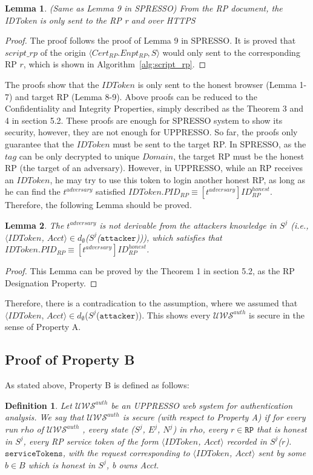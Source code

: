 \documentclass[letterpaper,onecolumn,10pt]{article}
\newtheorem{definition}{Definition}
\newtheorem{lemma}{Lemma}
\begin{document}
\begin{lemma}
(Same as Lemma 9 in SPRESSO) From the RP document, the IDToken is only sent to the RP r and over HTTPS
\end{lemma}
\begin{proof}
The proof follows the proof of Lemma 9 in SPRESSO.
It is proved that $script\_rp$ of the origin $\langle Cert_{RP}.Enpt_{RP}, S \rangle$ would only sent to the corresponding RP $r$, which is shown in Algorithm~\ref{alg:script_rp}.
\end{proof}


The proofs show that the $IDToken$ is only sent to the honest browser (Lemma 1-7) and  target RP (Lemma 8-9). 
Above proofs can be reduced to the {\color{blue}Confidentiality and Integrity Properties}, simply described as the {\color{blue} Theorem 3 and 4} in section 5.2.
These proofs are enough for SPRESSO system to show its security, however, they are not enough for UPPRESSO.
So far, the proofs only guarantee that the $IDToken$ must be sent to the target RP.
In SPRESSO, as the $tag$ can be only decrypted to unique $Domain$, the target RP must be the honest RP (the target of an adversary).
However, in UPPRESSO, while an RP receives an $IDToken$, he may try to use this token to login another honest RP, as long as he can find the $t^{adversary}$ satisfied $IDToken.PID_{RP} \equiv [t^{adversary}]ID_{RP}^{honest}$.
Therefore, the following Lemma should be proved.

\begin{lemma}
The $t^{adversary}$ is not derivable from the attackers knowledge in $S^j$ (i.e., $\langle IDToken$, $Acct \rangle \in d_{\emptyset}$($S^j$($\mathtt{attacker}$))), which satisfies that $IDToken.PID_{RP} \equiv [t^{adversary}]ID_{RP}^{honest}$.
\end{lemma}
\begin{proof}
This Lemma can be proved by the {\color{blue} Theorem 1} in section 5.2, as the {\color{blue} RP Designation Property}.
\end{proof}

Therefore, there is a contradication to the assumption, where we assumed that $\langle IDToken$, $Acct \rangle \in d_{\emptyset}$($S^j$($\mathtt{attacker}$)). This shows every $\mathcal{U\!W\!S}^{auth}$ is secure in the sense of Property A.

\subsection{Proof of Property B}
As stated above, Property B is defined as follows:
\begin{definition}
\label{def:B}
Let $\mathcal{U\!W\!S}^{auth}$  be an UPPRESSO web system for authentication analysis. We say that $\mathcal{U\!W\!S}^{auth}$  is secure (with respect to Property A) if for every run $rho$ of $\mathcal{U\!W\!S}^{auth}$ , every state ($S^j$, $E^j$, $N^j$) in $rho$, every $r \in \mathtt{RP}$ that is honest in
$S^j$, every RP service token of the form $\langle IDToken$, $Acct \rangle$ recorded in $S^j$($r$).$\mathtt{serviceTokens}$, with the request corresponding to $\langle IDToken$, $Acct \rangle$ sent by some $b \in B$ which is honest in $S^j$, b owns Acct.
\end{definition}
\end{document}
